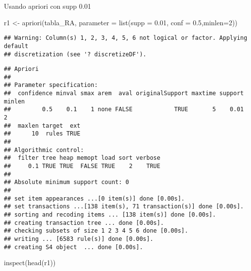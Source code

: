 \documentclass[
]{book}
\newenvironment{Shaded}{\begin{snugshade}}{\end{snugshade}}
\newcommand{\AttributeTok}[1]{\textcolor[rgb]{0.77,0.63,0.00}{#1}}
\newcommand{\DecValTok}[1]{\textcolor[rgb]{0.00,0.00,0.81}{#1}}
\newcommand{\FloatTok}[1]{\textcolor[rgb]{0.00,0.00,0.81}{#1}}
\newcommand{\FunctionTok}[1]{\textcolor[rgb]{0.00,0.00,0.00}{#1}}
\newcommand{\NormalTok}[1]{#1}
\newcommand{\OtherTok}[1]{\textcolor[rgb]{0.56,0.35,0.01}{#1}}
\begin{document}
Usando apriori con supp 0.01

\begin{Shaded}
\begin{Highlighting}[]
\NormalTok{r1 }\OtherTok{\textless{}{-}} \FunctionTok{apriori}\NormalTok{(tabla\_RA,  }\AttributeTok{parameter =} \FunctionTok{list}\NormalTok{(}\AttributeTok{supp =} \FloatTok{0.01}\NormalTok{, }\AttributeTok{conf =} \FloatTok{0.5}\NormalTok{,}\AttributeTok{minlen=}\DecValTok{2}\NormalTok{))}
\end{Highlighting}
\end{Shaded}

\begin{verbatim}
## Warning: Column(s) 1, 2, 3, 4, 5, 6 not logical or factor. Applying default
## discretization (see '? discretizeDF').
\end{verbatim}

\begin{verbatim}
## Apriori
## 
## Parameter specification:
##  confidence minval smax arem  aval originalSupport maxtime support minlen
##         0.5    0.1    1 none FALSE            TRUE       5    0.01      2
##  maxlen target  ext
##      10  rules TRUE
## 
## Algorithmic control:
##  filter tree heap memopt load sort verbose
##     0.1 TRUE TRUE  FALSE TRUE    2    TRUE
## 
## Absolute minimum support count: 0 
## 
## set item appearances ...[0 item(s)] done [0.00s].
## set transactions ...[138 item(s), 71 transaction(s)] done [0.00s].
## sorting and recoding items ... [138 item(s)] done [0.00s].
## creating transaction tree ... done [0.00s].
## checking subsets of size 1 2 3 4 5 6 done [0.00s].
## writing ... [6583 rule(s)] done [0.00s].
## creating S4 object  ... done [0.00s].
\end{verbatim}

\begin{Shaded}
\begin{Highlighting}[]
\FunctionTok{inspect}\NormalTok{(}\FunctionTok{head}\NormalTok{(r1))}
\end{Highlighting}
\end{Shaded}
\end{document}
